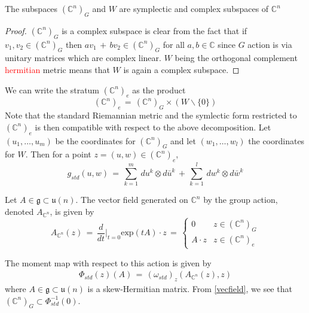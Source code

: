 \documentclass[a4paper,12pt]{article}
\newcommand{\C}{\mathbb{C}}
\newcommand{\inv}[1]{#1^{-1}}
\newcommand{\red}[1]{\textcolor{red}{#1}}
\begin{document}
	\begin{lemma}
		The subspaces $(\C^n)_G$ and $W$ are symplectic and complex subspaces of $\C^n$
	\end{lemma}
	\begin{proof}
		$(\C^n)_G$ is a complex subspace is clear from the fact that if $v_1, v_2 \in (\C^n)_G$ then $a v_1 \,+\, b v_2 \in (\C^n)_G$ for all $a,b\in \C$ since $G$ action is via unitary matrices which are complex linear. $W$ being the orthogonal complement \red{hermitian} metric means that $W$ is again a complex subspace.
		
		 
	\end{proof}
	We can write the stratum $(\C^n)_e$ as the product
	\begin{equation}
		(\C^n)_e \,=\, (\C^n)_G \times (W \backslash\{0\})
	\end{equation}
	Note that the standard Riemannian metric and the symlectic form restricted to $(\C^n)_e$ is then compatible with respect to the above decomposition. Let $(u_1,\dots, u_m)$ be the coordinates for $(\C^n)_G$ and let $(w_1,\dots,w_l)$ the coordinates for $W$. Then for a point $z=(u,w)\in (\C^n)_e$,
	\begin{equation}
		g_{std} (u,w) \,=\, \sum_{k=1}^m \, du^k \otimes d\bar{u}^k \,+\, \sum_{k=1}^l \, dw^k \otimes d\bar{w}^k
	\end{equation} 
	
	
	Let $A\in \mathfrak{g} \subset \mathfrak{u}(n)$. The vector field generated on $\C^n$ by the group action, denoted $A_{\C^n}$, is given by
	\begin{equation}\label{vecfield}
		A_{\C^n}(z) \,=\, \frac{d}{dt}\Bigr|_{t=0} \text{exp}(tA)\cdot z \,=\, \begin{cases}
			0 & \text{$z \in (\C^n)_G$} \\
			A \cdot z & \text{$z \in (\C^n)_{e}$}
		\end{cases}
\end{equation}
	
	The moment map with respect to this action is given by
	\begin{align*}\label{standardmoment}
		\Phi_{std}(z) (A) \,=\, (\omega_{std})_z(A_{\C^n}(z), z)
	\end{align*}
	where $A\in \mathfrak{g}\subset \mathfrak{u}(n)$ is a skew-Hermitian matrix. From \eqref{vecfield}, we see that $(\C^n)_G \subset \inv{\Phi_{std}}(0)$.
	
\end{document}
